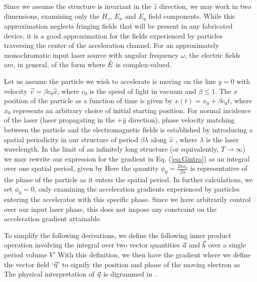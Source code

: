 Since we assume the structure is invariant in the $\hat{z}$ direction, we may work in two dimensions, examining only the $H_z$, $E_x$ and $E_y$ field components.
While this approximation neglects fringing fields that will be present in any fabricated device, it is a good approximation for the fields experienced by particles traversing the center of the acceleration channel.
For an approximately monochromatic input laser source with angular frequency $\omega$, the electric fields are, in general, of the form
%
where $\tilde{E}$ is complex-valued.

Let us assume the particle we wish to accelerate is moving on the line $y=0$ with velocity $\vec{v} = \beta c_0 \hat{x}$, where $c_0$ is the speed of light in vacuum and $\beta \leq 1$.
The $x$ position of the particle as a function of time is given by $x(t) = x_0 + \beta c_0 t$, where $x_0$ represents an arbitrary choice of initial starting position.
For normal incidence of the laser (laser propagating in the $+\hat{y}$ direction), phase velocity matching between the particle and the electromagnetic fields is established by introducing a spatial periodicity in our structure of period $\beta \lambda$ along $\hat{x}$ , where $\lambda$ is the laser wavelength.
In the limit of an infinitely long structure (or equivalently, $T \to \infty $) we may rewrite our expression for the gradient in Eq. (\ref{eq:Gintro}) as an integral over one spatial period, given by
%
%
Here the quantity $\phi_0 = \frac{2\pi x_0}{\beta\lambda}$ is representative of the phase of the particle as it enters the spatial period.
In further calculations, we set $\phi_0 = 0$, only examining the acceleration gradients experienced by particles entering the accelerator with this specific phase.
Since we have arbitrarily control over our input laser phase, this does not impose any constraint on the acceleration gradient attainable.

To simplify the following derivations, we define the following inner product operation involving the integral over two vector quantities $\vec{a}$ and $\vec{b}$ over a single period volume $V'$
%
%
With this definition, we then have the gradient
%
%
where we define the vector field `$\vec{\eta}$' to signify the position and phase of the moving electron as
The physical interpretation of $\vec{\eta}$ is digrammed in .

